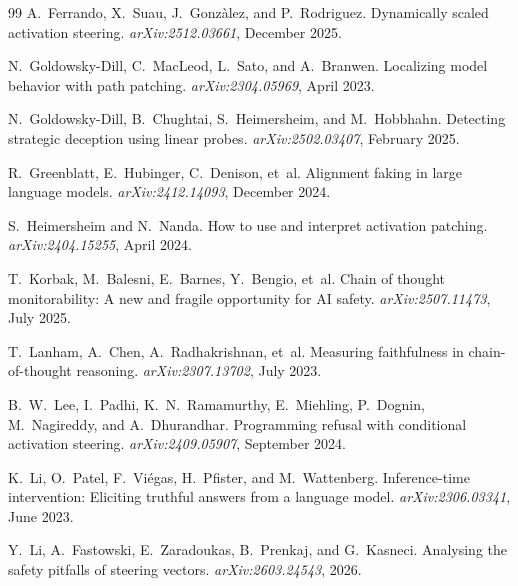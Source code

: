 \documentclass[11pt]{article}
\theoremstyle{definition}
\newcommand{\1}{\mathbf{1}}
\begin{document}
\begin{thebibliography}{99}
A.~Ferrando, X.~Suau, J.~Gonz\`alez, and P.~Rodriguez.
\newblock Dynamically scaled activation steering.
\newblock \emph{arXiv:2512.03661}, December 2025.

N.~Goldowsky-Dill, C.~MacLeod, L.~Sato, and A.~Branwen.
\newblock Localizing model behavior with path patching.
\newblock \emph{arXiv:2304.05969}, April 2023.

N.~Goldowsky-Dill, B.~Chughtai, S.~Heimersheim, and M.~Hobbhahn.
\newblock Detecting strategic deception using linear probes.
\newblock \emph{arXiv:2502.03407}, February 2025.

R.~Greenblatt, E.~Hubinger, C.~Denison, et~al.
\newblock Alignment faking in large language models.
\newblock \emph{arXiv:2412.14093}, December 2024.

S.~Heimersheim and N.~Nanda.
\newblock How to use and interpret activation patching.
\newblock \emph{arXiv:2404.15255}, April 2024.

T.~Korbak, M.~Balesni, E.~Barnes, Y.~Bengio, et~al.
\newblock Chain of thought monitorability: A new and fragile opportunity for AI safety.
\newblock \emph{arXiv:2507.11473}, July 2025.

T.~Lanham, A.~Chen, A.~Radhakrishnan, et~al.
\newblock Measuring faithfulness in chain-of-thought reasoning.
\newblock \emph{arXiv:2307.13702}, July 2023.

B.~W.~Lee, I.~Padhi, K.~N.~Ramamurthy, E.~Miehling, P.~Dognin, M.~Nagireddy, and A.~Dhurandhar.
\newblock Programming refusal with conditional activation steering.
\newblock \emph{arXiv:2409.05907}, September 2024.

K.~Li, O.~Patel, F.~Vi\'egas, H.~Pfister, and M.~Wattenberg.
\newblock Inference-time intervention: Eliciting truthful answers from a language model.
\newblock \emph{arXiv:2306.03341}, June 2023.

Y.~Li, A.~Fastowski, E.~Zaradoukas, B.~Prenkaj, and G.~Kasneci.
\newblock Analysing the safety pitfalls of steering vectors.
\newblock \emph{arXiv:2603.24543}, 2026.


\end{thebibliography}
\end{document}
